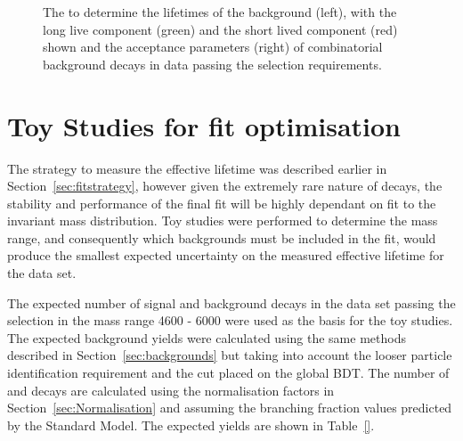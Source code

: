 {\begin{figure}[htbp]
\begin{subfigure}[b]{0.48\textwidth}
   \end{subfigure}
    \caption{The \ml to determine the lifetimes of the background (left), with the long live component (green) and the short lived component (red) shown and the acceptance parameters (right) of combinatorial background decays in data passing the \bhh selection requirements.}
    \label{fig:CBGaccpt}
\end{figure}


\section{Toy Studies for fit optimisation}
\label{sec:toys}
The strategy to measure the \bsmumu effective lifetime was described earlier in Section~\ref{sec:fitstrategy}, however given the extremely rare nature of \bsmumu decays, the stability and performance of the final fit will be highly dependant on \ml fit to the invariant mass distribution. Toy studies were performed to determine the mass range, and consequently which backgrounds must be included in the \ml fit, would produce the smallest expected uncertainty on the measured effective lifetime for the data set. 

The expected number of signal and background decays in the data set passing the \bsmumu selection in the mass range 4600 - 6000 \mevcc were used as the basis for the toy studies. The expected background yields were calculated using the same methods described in Section~\ref{sec:backgrounds} but taking into account the looser particle identification requirement and the cut placed on the global BDT. The number of \bsmumu and \bdmumu decays are calculated using the normalisation factors in Section~\ref{sec:Normalisation} and assuming the branching fraction values predicted by the Standard Model. The expected yields are shown in Table~\ref{}. 

}

